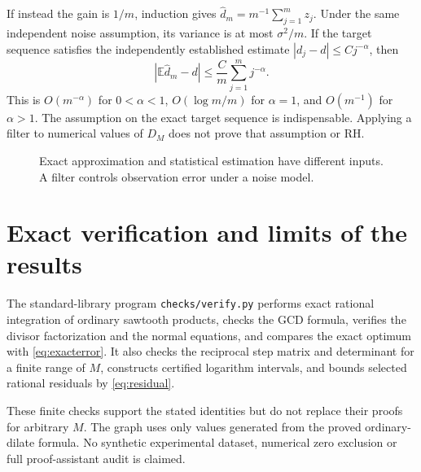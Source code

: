 \documentclass[11pt]{amsart}
\theoremstyle{definition}
\newcommand{\E}{\mathbb E}\newcommand{\Var}{\operatorname{Var}}
\begin{document}
If instead the gain is $1/m$, induction gives
$\widehat d_m=m^{-1}\sum_{j=1}^m z_j$. Under the same independent
noise assumption, its variance is at most $\sigma^2/m$. If the target
sequence satisfies the independently established estimate
$|d_j-d|\le Cj^{-\alpha}$, then
\[
 |\E\widehat d_m-d|\le\frac C m\sum_{j=1}^m j^{-\alpha}.
\]
This is $O(m^{-\alpha})$ for $0<\alpha<1$, $O(\log m/m)$ for
$\alpha=1$, and $O(m^{-1})$ for $\alpha>1$. The assumption on the
exact target sequence is indispensable. Applying a filter to numerical
values of $D_M$ does not prove that assumption or RH.

\begin{figure}[tb]
\centering
{}
\caption{Exact approximation and statistical estimation have different
inputs. A filter controls observation error under a noise model.}
\end{figure}

\section{Exact verification and limits of the results}
The standard-library program \texttt{checks/verify.py} performs exact
rational integration of ordinary sawtooth products, checks the GCD
formula, verifies the divisor factorization and the normal equations,
and compares the exact optimum with \eqref{eq:exacterror}. It also
checks the reciprocal step matrix and determinant for a finite range
of $M$, constructs certified logarithm intervals, and bounds selected
rational residuals by \eqref{eq:residual}.

These finite checks support the stated identities but do not replace
their proofs for arbitrary $M$. The graph uses only values generated
from the proved ordinary-dilate formula. No synthetic experimental
dataset, numerical zero exclusion or full proof-assistant audit is
claimed.
\end{document}
